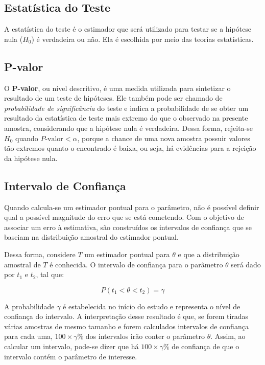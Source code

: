 \documentclass[
  portuguese,
]{estat/estat}
\begin{document}
\subsection{Estatística do Teste}\label{estatuxedstica-do-teste}

A estatística do teste é o estimador que será utilizado para testar se a
hipótese nula (\(H_{0}\)) é verdadeira ou não. Ela é escolhida por meio
das teorias estatísticas.

\subsection{P-valor}\label{p-valor}

O \textbf{P-valor}, ou nível descritivo, é uma medida utilizada para
sintetizar o resultado de um teste de hipóteses. Ele também pode ser
chamado de \emph{probabilidade de significância} do teste e indica a
probabilidade de se obter um resultado da estatística de teste mais
extremo do que o observado na presente amostra, considerando que a
hipótese nula é verdadeira. Dessa forma, rejeita-se \(H_{0}\) quando
\(P\text{-valor} < \alpha\), porque a chance de uma nova amostra possuir
valores tão extremos quanto o encontrado é baixa, ou seja, há evidências
para a rejeição da hipótese nula.

\subsection{Intervalo de Confiança}\label{intervalo-de-confianuxe7a}

Quando calcula-se um estimador pontual para o parâmetro, não é possível
definir qual a possível magnitude do erro que se está cometendo. Com o
objetivo de associar um erro à estimativa, são construídos os intervalos
de confiança que se baseiam na distribuição amostral do estimador
pontual.

Dessa forma, considere \(T\) um estimador pontual para \(\theta\) e que
a distribuição amostral de \(T\) é conhecida. O intervalo de confiança
para o parâmetro \(\theta\) será dado por \(t_{1}\) e \(t_{2}\), tal
que:

\[ P(t_{1} < \theta < t_{2}) = \gamma \]

A probabilidade \(\gamma\) é estabelecida no início do estudo e
representa o nível de confiança do intervalo. A interpretação desse
resultado é que, se forem tiradas várias amostras de mesmo tamanho e
forem calculados intervalos de confiança para cada uma,
\(100 \times \gamma \%\) dos intervalos irão conter o parâmetro
\(\theta\). Assim, ao calcular um intervalo, pode-se dizer que há
\(100 \times \gamma \%\) de confiança de que o intervalo contém o
parâmetro de interesse.
\end{document}
